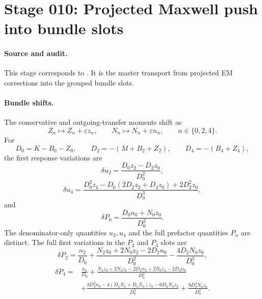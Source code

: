 \section[Stage 010]{Stage 010: Projected Maxwell push into bundle slots}
\label{stage:010}


\paragraph{Source and audit.}
This stage corresponds to
.
It is the master transport from projected EM corrections into the grouped
bundle slots.

\paragraph{Bundle shifts.}
The conservative and outgoing-transfer moments shift as
\begin{equation}
\label{eq:stage010-projected-shifts}
Z_n\mapsto Z_n+\varepsilon z_n,\qquad
N_n\mapsto N_n+\varepsilon n_n,\qquad n\in\{0,2,4\}.
\end{equation}
For
\[
D_0=K-B_0-Z_0,\qquad D_2=-(M+B_2+Z_2),\qquad D_4=-(B_4+Z_4),
\]
the first response variations are
\begin{equation}
\label{eq:stage010-du2}
\delta u_2=\frac{D_0z_2-D_2z_0}{D_0^2},
\end{equation}
\begin{equation}
\label{eq:stage010-du4}
\delta u_4=
\frac{D_0^2z_4-D_0(2D_2z_2+D_4z_0)+2D_2^2z_0}{D_0^3},
\end{equation}
and
\begin{equation}
\label{eq:stage010-dp0}
\delta P_0=\frac{D_0n_0+N_0z_0}{D_0^2}.
\end{equation}
The denominator-only quantities \(u_2,u_4\) and the full prefactor quantities
\(P_n\) are distinct.  The full first variations in the \(P_2\) and \(P_4\)
slots are
\begin{equation}
\label{eq:stage010-dP2}
\delta P_2=
\frac{n_2}{D_0}
+\frac{N_2z_0+2N_0z_2-2D_2n_0}{D_0^2}
-\frac{4D_2N_0z_0}{D_0^3},
\end{equation}
\begin{equation}
\label{eq:stage010-dP4}
\begin{aligned}
\delta P_4={}&
\frac{n_4}{D_0}
+\frac{N_4z_0+2N_2z_2-2D_2n_2+2N_0z_4-2D_4n_0}{D_0^2}\\
&+\frac{3D_2^2n_0-4(D_2N_2+D_4N_0)z_0-6D_2N_0z_2}{D_0^3}
+\frac{9D_2^2N_0z_0}{D_0^4}.
\end{aligned}
\end{equation}


